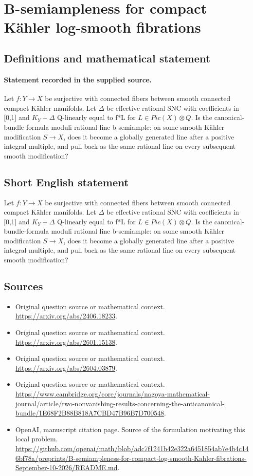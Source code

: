 \documentclass[11pt]{article}
\begin{document}
\section*{B-semiampleness for compact Kähler log-smooth fibrations}\label{statement}
\subsection{Definitions and mathematical statement}
\paragraph{Statement recorded in the supplied source.}
Let $f:Y\to X$ be surjective with connected fibers between smooth connected compact Kähler manifolds. Let $\Delta $ be effective rational SNC with coefficients in [0,1] and $K_Y+\Delta $ Q-linearly equal to f*L for $L\in Pic(X)\otimes Q$. Is the canonical-bundle-formula moduli rational line b-semiample: on some smooth Kähler modification $S\to X$, does it become a globally generated line after a positive integral multiple, and pull back as the same rational line on every subsequent smooth modification?
\subsection{Short English statement}
Let $f:Y\to X$ be surjective with connected fibers between smooth connected compact Kähler manifolds. Let $\Delta $ be effective rational SNC with coefficients in [0,1] and $K_Y+\Delta $ Q-linearly equal to f*L for $L\in Pic(X)\otimes Q$. Is the canonical-bundle-formula moduli rational line b-semiample: on some smooth Kähler modification $S\to X$, does it become a globally generated line after a positive integral multiple, and pull back as the same rational line on every subsequent smooth modification?
\subsection{Sources}
\begin{itemize}
\item[S1] Original question source or mathematical context.
\url{https://arxiv.org/abs/2406.18233}.
\item[S2] Original question source or mathematical context.
\url{https://arxiv.org/abs/2601.15138}.
\item[S3] Original question source or mathematical context.
\url{https://arxiv.org/abs/2604.03879}.
\item[S4] Original question source or mathematical context.
\url{https://www.cambridge.org/core/journals/nagoya-mathematical-journal/article/two-nonvanishing-results-concerning-the-anticanonical-bundle/1E68F2B88B818A7CBD47B96B7D700548}.
\item[S5] OpenAI, manuscript citation page. Source of the formulation motivating this local problem.
\url{https://github.com/openai/math/blob/adc7f1241b42e322a6451854ab7e4b4c146bf78a/preprints/B-semiampleness-for-compact-log-smooth-Kahler-fibrations-September-10-2026/README.md}.
\end{itemize}
\end{document}
